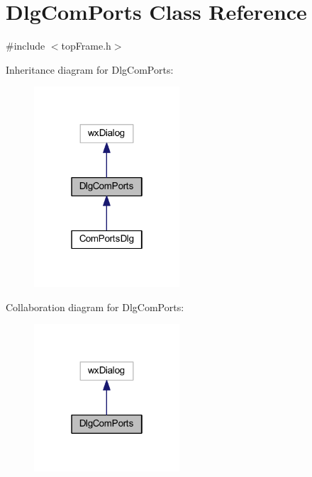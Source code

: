 \hypertarget{class_dlg_com_ports}{\section{Dlg\-Com\-Ports Class Reference}
\label{class_dlg_com_ports}
}


{\ttfamily \#include $<$top\-Frame.\-h$>$}



Inheritance diagram for Dlg\-Com\-Ports\-:
\nopagebreak
\begin{figure}[H]
\begin{center}
\leavevmode
\includegraphics[width=154pt]{class_dlg_com_ports__inherit__graph}
\end{center}
\end{figure}


Collaboration diagram for Dlg\-Com\-Ports\-:
\nopagebreak
\begin{figure}[H]
\begin{center}
\leavevmode
\includegraphics[width=154pt]{class_dlg_com_ports__coll__graph}
\end{center}
\end{figure}
